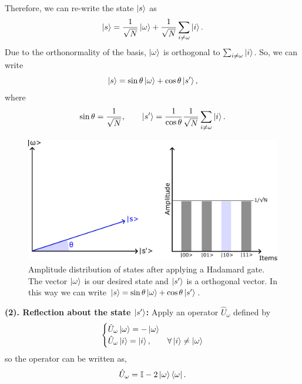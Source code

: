 Therefore, we can re-write the state $\ket{s}$ as
\begin{equation}
    \ket{s} = \frac{1}{\sqrt{N}}\ket{\omega} + \frac{1}{\sqrt{N}}\sum_{i \neq \omega} \ket{i}.
\end{equation}
Due to the orthonormality of the basis, $\ket{\omega}$ is orthogonal to $\sum_{i \neq \omega} \ket{i}$. So, we can write
\begin{equation}
    \ket{s} = \sin{\theta}\ket{\omega} + \cos{\theta}\ket{s'},
\end{equation}
where
\begin{equation}
    \sin{\theta} = \frac{1}{\sqrt{N}}, \quad\quad  \ket{s'} = \frac{1}{\cos{\theta}}\frac{1}{\sqrt{N}}\sum_{i\neq \omega}\ket{i}.
\end{equation}
\begin{figure}[H]
\centering
    \includegraphics[scale=0.55]{Figures/Grover_Step1.pdf}
    \caption{Amplitude distribution of states after applying a Hadamard gate. The vector $\ket{\omega}$ is our desired state and $\ket{s'}$ is a orthogonal vector. In this way we can write $\ket{s} = \sin{\theta}\ket{\omega} + \cos{\theta}\ket{s'}$.}
    \label{fig:Grover_step1}
\end{figure}
\textbf{(2). Reflection about the state $\ket{s'}$:} Apply an operator $\hat{U}_{\omega}$ defined by
\begin{equation}
     \begin{cases}
       \hat{U}_{\omega}\ket{\omega} = -\ket{\omega} \\
       \hat{U}_{\omega}\ket{i} = \ket{i}, &  \forall \ket{i}\neq \ket{\omega} \\
     \end{cases}
\end{equation}
so the operator can be written as,
\begin{equation}
    \hat{U}_{\omega} = \mathbb{I} - 2\ket{\omega}\bra{\omega}.
\end{equation}
